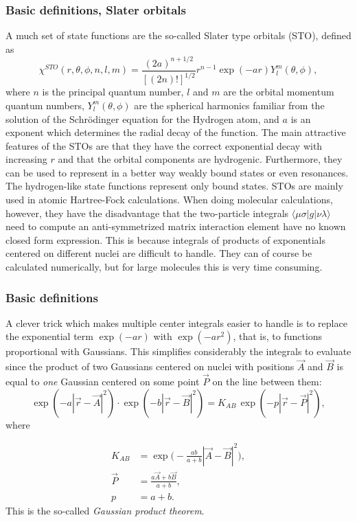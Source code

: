 \documentclass{beamer}
\begin{document}
\begin{frame}
\frametitle{Basic definitions, Slater orbitals}

\begin{block}{}

A much set of state functions are the so-called 
Slater type orbitals (STO), defined as
\begin{equation}
 \chi^{STO}(r,\theta,\phi,n,l,m) = \frac{(2a)^{n+1/2}}{[(2n)!]^{1/2}}r^{n-1}\exp(-a r) Y^m_l(\theta,\phi),
\end{equation}
where $n$ is the principal quantum number, $l$ and $m$ are the orbital momentum quantum numbers,
$Y^m_l(\theta,\phi)$ are the spherical harmonics familiar from the solution of the Schr\"odinger
equation for the Hydrogen atom, and $a$ is an exponent which determines the radial decay of the
function. The main attractive features of the STOs are that they have the correct exponential decay with
increasing $r$ and that the orbital components are hydrogenic. 
Furthermore, they can be used to represent in a better way weakly bound states or even resonances. The hydrogen-like state functions 
represent only bound states.
STOs are mainly 
used in atomic Hartree-Fock calculations. When doing molecular calculations, however, they have the
disadvantage that the two-particle integrals $\langle\mu\sigma\vert g\vert\nu\lambda\rangle$ need to compute 
an anti-symmetrized matrix interaction element have no known closed form expression. This is because integrals of products
of exponentials centered on different nuclei are difficult to handle. They can of course be calculated
numerically, but for large molecules this is very time consuming.
\end{block}
\end{frame}

\begin{frame}
\frametitle{Basic definitions}

\begin{block}{}

A clever trick which makes multiple center integrals easier to handle is to replace the exponential
term $\exp(-a r)$ with $\exp(-a r^2)$, that is, to functions proportional with Gaussians. This simplifies 
considerably the integrals to evaluate since the product of two Gaussians centered on nuclei with positions
$\vec A$ and $\vec B$ is equal to \emph{one} Gaussian centered on some point $\vec P$ on
the line between them:
\begin{equation}
\label{eq:gaussian_product}
 \exp(-a|\vec r - \vec A|^2)\cdot \exp(-b|\vec r - \vec B|^2) = K_{AB}\,\exp(-p|\vec r - \vec P|^2),
\end{equation}
where

\begin{align}
 K_{AB} & =  \exp\Big(-\frac{ab}{a + b}|\vec A - \vec B|^2\Big), \\
 \vec P & =  \frac{a \vec A + b \vec B}{a + b}, \\
 p & =  a + b.
\end{align}
This is the so-called \emph{Gaussian product theorem}.
\end{block}
\end{frame}
\end{document}
